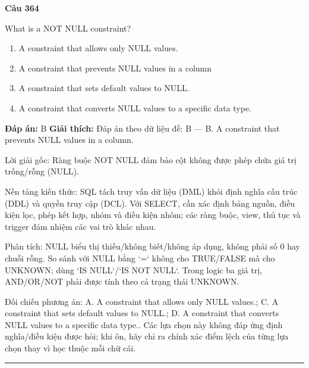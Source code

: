 \documentclass[11pt,a4paper]{article}
\newenvironment{question}[1]{%
  \par\vspace{1em}\noindent\textbf{\large Câu #1}\par\vspace{0.4em}
}{%
  \par\vspace{1em}\hrule\vspace{0.6em}
}
\newenvironment{choices}{%
  \begin{enumerate}[label=\textbf{\Alph*.},leftmargin=2.2em,itemsep=2pt,topsep=3pt]
}{%
  \end{enumerate}
}
\newcommand{\choice}{\item}
\begin{document}
\begin{question}{364}
What is a NOT NULL constraint?
\begin{choices}
\choice A constraint that allows only NULL values.
\choice A constraint that prevents NULL values in a column
\choice A constraint that sets default values to NULL.
\choice A constraint that converts NULL values to a specific data type.
\end{choices}
\textbf{Đáp án:} B
\textbf{Giải thích:} Đáp án theo dữ liệu đề: B — B. A constraint that prevents NULL values in a column.

Lời giải gốc: Ràng buộc NOT NULL đảm bảo cột không được phép chứa giá trị trống/rỗng (NULL).

Nền tảng kiến thức: SQL tách truy vấn dữ liệu (DML) khỏi định nghĩa cấu trúc (DDL) và quyền truy cập (DCL). Với SELECT, cần xác định bảng nguồn, điều kiện lọc, phép kết hợp, nhóm và điều kiện nhóm; các ràng buộc, view, thủ tục và trigger đảm nhiệm các vai trò khác nhau.

Phân tích: NULL biểu thị thiếu/không biết/không áp dụng, không phải số 0 hay chuỗi rỗng. So sánh với NULL bằng `=` không cho TRUE/FALSE mà cho UNKNOWN; dùng `IS NULL`/`IS NOT NULL`. Trong logic ba giá trị, AND/OR/NOT phải được tính theo cả trạng thái UNKNOWN.

Đối chiếu phương án: A. A constraint that allows only NULL values.; C. A constraint that sets default values to NULL.; D. A constraint that converts NULL values to a specific data type.. Các lựa chọn này không đáp ứng định nghĩa/điều kiện được hỏi; khi ôn, hãy chỉ ra chính xác điểm lệch của từng lựa chọn thay vì học thuộc mỗi chữ cái.
\end{question}
\end{document}
